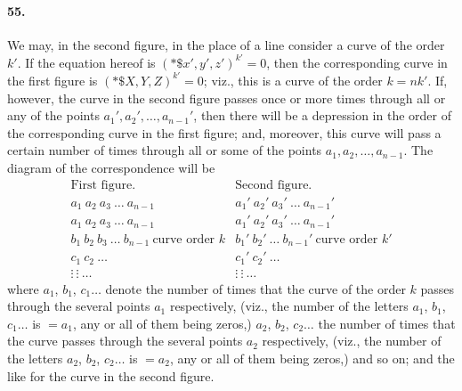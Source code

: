 \documentclass[11pt]{article}
\begin{document}
\medskip

\paragraph{55.}
We may, in the second figure, in the place of a line consider a curve of
the order $k'$. If the equation hereof is $(*\$\!x',y',z')^{k'}=0$, then
the corresponding curve in the first figure is $(*\$\!X,Y,Z)^{k'}=0$;
viz., this is a curve of the order $k=nk'$. If, however, the curve in the
second figure passes once or more times through all or any of the points
$a_{1}',a_{2}',\ldots,a_{n-1}'$, then there will be a depression in the
order of the corresponding curve in the first figure; and, moreover, this
curve will pass a certain number of times through all or some of the
points $a_{1},a_{2},\ldots,a_{n-1}$. The diagram of the correspondence
will be
\[
\begin{array}{l|l}
\text{First figure.} & \text{Second figure.}\\[2pt]
a_{1}\ a_{2}\ a_{3}\ \ldots\ a_{n-1} &
a_{1}'\ a_{2}'\ a_{3}'\ \ldots\ a_{n-1}'\\
a_{1}\ a_{2}\ a_{3}\ \ldots\ a_{n-1} &
a_{1}'\ a_{2}'\ a_{3}'\ \ldots\ a_{n-1}'\\
b_{1}\ b_{2}\ b_{3}\ \ldots\ b_{n-1}\ \text{curve order }k &
b_{1}'\ b_{2}'\ \ldots\ b_{n-1}'\ \text{curve order }k'\\
c_{1}\ c_{2}\ \ldots & c_{1}'\ c_{2}'\ \ldots\\
\vdots\ \vdots\ \ldots & \vdots\ \vdots\ \ldots
\end{array}
\]
where $a_{1}$, $b_{1}$, $c_{1}\ldots$ denote the number of times that
the curve of the order $k$ passes through the several points $a_{1}$
respectively, (viz., the number of the letters $a_{1}$, $b_{1}$,
$c_{1}\ldots$ is $=a_{1}$, any or all of them being zeros,) $a_{2}$,
$b_{2}$, $c_{2}\ldots$ the number of times that the curve passes through
the several points $a_{2}$ respectively, (viz., the number of the
letters $a_{2}$, $b_{2}$, $c_{2}\ldots$ is $=a_{2}$, any or all of them
being zeros,) and so on; and the like for the curve in the second figure.

\medskip
\end{document}
